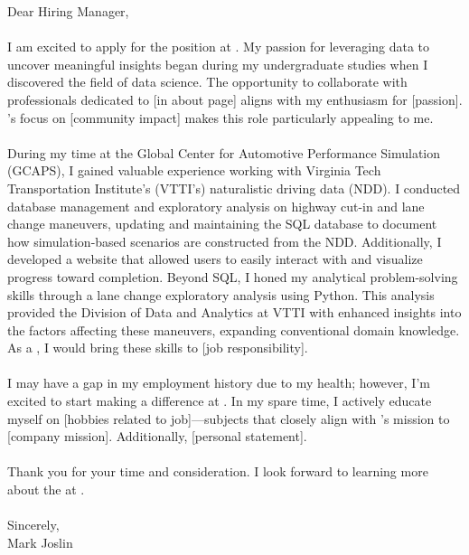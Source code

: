 \documentclass[10pt]{../cv} %
\begin{document}

\cvHeader{\name}{\designation}{\phone}{\location}{\email}{\github}{\linkedin}
\vspace{\baselineskip}


Dear Hiring Manager,
\\
\\
I am excited to apply for the \position{} position at \company{}. My passion for leveraging data to uncover meaningful insights began during my undergraduate studies when I discovered the field of data science. The opportunity to collaborate with professionals dedicated to [in about page] aligns with my enthusiasm for [passion]. \company{}’s focus on [community impact] makes this role particularly appealing to me.
\\
\\
During my time at the Global Center for Automotive Performance Simulation (GCAPS), I gained valuable experience working with Virginia Tech Transportation Institute’s (VTTI’s) naturalistic driving data (NDD). I conducted database management and exploratory analysis on highway cut-in and lane change maneuvers, updating and maintaining the SQL database to document how simulation-based scenarios are constructed from the NDD. Additionally, I developed a website that allowed users to easily interact with and visualize progress toward completion. Beyond SQL, I honed my analytical problem-solving skills through a lane change exploratory analysis using Python. This analysis provided the Division of Data and Analytics at VTTI with enhanced insights into the factors affecting these maneuvers, expanding conventional domain knowledge. As a \position{}, I would bring these skills to [job responsibility].
\\
\\
I may have a gap in my employment history due to my health; however, I’m excited to start making a difference at \company{}. In my spare time, I actively educate myself on [hobbies related to job]—subjects that closely align with \company{}’s mission to [company mission]. Additionally, [personal statement].
\\
\\
Thank you for your time and consideration. I look forward to learning more about the \position{} at \company{}.
\\
\\
Sincerely,
\\
Mark Joslin
\end{document}
